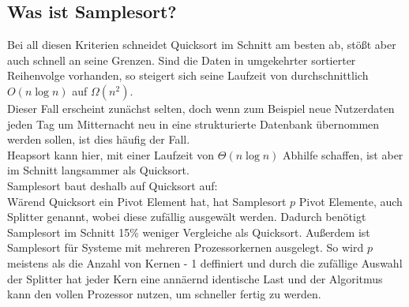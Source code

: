     \subsection{Was ist Samplesort?}
    Bei all diesen Kriterien schneidet Quicksort im Schnitt am besten ab, stößt aber auch schnell an seine Grenzen. Sind die Daten in umgekehrter sortierter Reihenvolge vorhanden, so steigert sich seine Laufzeit von durchschnittlich $O(n\log{n})$ auf $\Omega(n^2)$.\\
    Dieser Fall erscheint zunächst selten, doch wenn zum Beispiel neue Nutzerdaten jeden Tag um Mitternacht neu in eine strukturierte Datenbank übernommen werden sollen, ist dies häufig der Fall.\\
    Heapsort kann hier, mit einer Laufzeit von $\Theta(n\log{n})$ Abhilfe schaffen, ist aber im Schnitt langsammer als Quicksort.\\
    Samplesort baut deshalb auf Quicksort auf:\\
    W\"arend Quicksort ein Pivot Element hat, hat Samplesort $p$ Pivot Elemente, auch Splitter genannt, wobei diese zuf\"allig ausgew\"alt werden.
    Dadurch ben\"otigt Samplesort im Schnitt 15\% weniger Vergleiche als Quicksort. \autocite{frazer-1970}
    Außerdem ist Samplesort f\"ur Systeme mit mehreren Prozessorkernen ausgelegt.
    So wird $p$ meistens als die Anzahl von Kernen - 1 deffiniert und durch die zuf\"allige Auswahl der Splitter hat jeder Kern eine ann\"aernd identische Last und der Algoritmus kann den vollen Prozessor nutzen, um schneller fertig zu werden.
    
